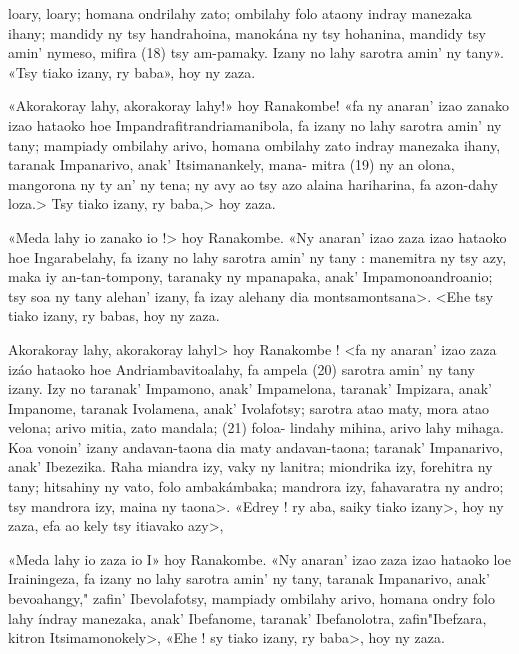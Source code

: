 loary, loary; homana ondrilahy zato; ombilahy folo ataony indray manezaka
ihany; mandidy ny tsy handrahoina, manokána ny tsy hohanina, mandidy
tsy amin' nymeso, mifira (18) tsy am-pamaky. Izany no lahy sarotra amin'
ny tany». «Tsy tiako izany, ry baba», hoy ny zaza.

«Akorakoray lahy, akorakoray lahy!» hoy Ranakombe! «fa ny anaran'
izao zanako izao hataoko hoe Impandrafitrandriamanibola, fa izany no lahy
sarotra amin' ny tany; mampiady ombilahy arivo, homana ombilahy zato
indray manezaka ihany, taranak Impanarivo, anak' Itsimanankely, mana-
mitra (19) ny an olona, mangorona ny ty an' ny tena; ny avy ao tsy azo
alaina hariharina, fa azon-dahy loza.> Tsy tiako izany, ry baba,> hoy
zaza. 

«Meda lahy io zanako io !> hoy Ranakombe. «Ny anaran' izao zaza
izao hataoko hoe Ingarabelahy, fa izany no lahy sarotra amin' ny tany :
manemitra ny tsy azy, maka iy an-tan-tompony, taranaky ny mpanapaka,
anak' Impamonoandroanio; tsy soa ny tany alehan' izany, fa izay alehany
dia montsamontsana>. <Ehe tsy tiako izany, ry babas, hoy ny zaza.

Akorakoray lahy, akorakoray lahyl> hoy Ranakombe ! <fa ny
anaran' izao zaza izáo hataoko hoe Andriambavitoalahy, fa ampela (20)
sarotra amin' ny tany izany. Izy no taranak' Impamono, anak' Impamelona,
taranak' Impizara, anak' Impanome, taranak Ivolamena, anak' Ivolafotsy;
sarotra atao maty, mora atao velona; arivo mitia, zato mandala; (21) foloa-
lindahy mihina, arivo lahy mihaga. Koa vonoin' izany andavan-taona dia
maty andavan-taona; taranak' Impanarivo, anak' Ibezezika. Raha miandra
izy, vaky ny lanitra; miondrika izy, forehitra ny tany; hitsahiny ny vato,
folo ambakámbaka; mandrora izy, fahavaratra ny andro; tsy mandrora izy,
maina ny taona>. «Edrey ! ry aba, saiky tiako izany>, hoy ny zaza, efa ao
kely tsy itiavako azy>,

«Meda lahy io zaza io I» hoy Ranakombe. «Ny anaran' izao zaza izao
hataoko loe Irainingeza, fa izany no lahy sarotra amin' ny tany, taranak
Impanarivo, anak' bevoahangy," zafin' Ibevolafotsy, mampiady ombilahy
arivo, homana ondry folo lahy índray manezaka, anak' Ibefanome, taranak'
Ibefanolotra, zafin"Ibefzara, kitron Itsimamonokely>, «Ehe ! sy tiako
izany, ry baba>, hoy ny zaza.

